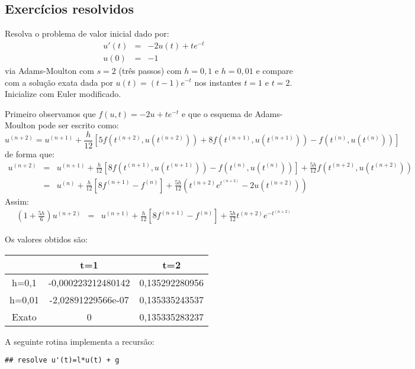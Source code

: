 \subsection*{Exercícios resolvidos}
\begin{exeresol} Resolva o problema de valor inicial dado por:
\begin{eqnarray}
 u'(t)&=& -2u(t) + te^{-t}\\
 u(0)&=&-1
\end{eqnarray}
via Adams-Moulton com $s=2$ (três passos) com $h=0,1$ e $h=0,01$ e compare com a solução exata dada por $u(t)=(t-1)e^{-t}$ nos instantes $t=1$ e $t=2$. Inicialize com Euler modificado.

 \end{exeresol}
\begin{resol}
 Primeiro observamos que $f(u,t)=-2u + te^{-t}$ e que o esquema de Adams-Moulton pode ser escrito como:
 \begin{equation}
  u^{(n+2)}=u^{(n+1)}+\frac{h}{12}\left[5f\left(t^{(n+2)},u(t^{(n+2)})\right)+8f\left(t^{(n+1)},u(t^{(n+1)})\right)-f\left(t^{(n)},u(t^{(n)})\right)\right]
 \end{equation}
 de forma que:
 \begin{eqnarray}
  u^{(n+2)}&=&u^{(n+1)}+\frac{h}{12}\left[8f\left(t^{(n+1)},u(t^{(n+1)})\right)-f\left(t^{(n)},u(t^{(n)})\right)\right]+\frac{5h}{12}f\left(t^{(n+2)},u(t^{(n+2)})\right)\\
  &=&u^{(n)}+\frac{h}{12}\left[8f^{(n+1)}-f^{(n)}\right]+\frac{5h}{12}\left(t^{(n+2)}e^{t^{(n+2)}} -2 u(t^{(n+2)})\right)
   \end{eqnarray}
 Assim:
 \begin{eqnarray}
  \left(1+\frac{5h}{6}\right)u^{(n+2)}
  &=&u^{(n+1)}+\frac{h}{12}\left[8f^{(n+1)}-f^{(n)}\right]+\frac{5h}{12}t^{(n+2)}e^{-t^{(n+2)}}
  \end{eqnarray}

 Os valores obtidos são:

 \begin{tabular}{|c|c|c|}
 \hline
  &t=1&t=2\\
 \hline
  h=0,1  & -0,000223212480142 & 0,135292280956\\
  h=0,01 & -2,02891229566e-07& 0,135335243537\\
  Exato  & 0 & 0,135335283237\\
  \hline
 \end{tabular}
\ifispython
A seguinte rotina implementa a recursão:
\begin{verbatim}
## resolve u'(t)=l*u(t) + g


\end{verbatim}
\end{resol}
